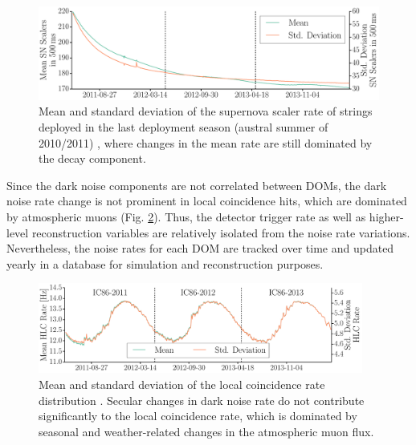 \begin{figure}[!h]
 \centering
 \includegraphics[width=1.0\textwidth]{graphics/dom/performance/darknoise/SN_Scalers_IC86_mean_variance_Histo_IC86_2011_2012_2013_geomapping.pdf}
 \caption{Mean and standard deviation of the supernova scaler rate of strings
   deployed in the last deployment season (austral summer of 2010/2011)
   \cite{briedel_phd}, where changes in the mean rate are
still dominated by the decay component.} 
 \label{fig:noise_over_time_briedel_lastseasondepoyed}
\end{figure}

Since the dark noise components are not correlated between
DOMs, the dark noise rate change is not prominent in local coincidence
hits, which are dominated by atmospheric muons (Fig.
\ref{fig:hlc_over_time_briedel}).  Thus, the detector trigger rate as well
as higher-level reconstruction variables are relatively isolated from the
noise rate variations.  Nevertheless, the noise rates for each DOM are
tracked over time and updated yearly in a database for simulation and
reconstruction purposes. 

\begin{figure}[!h]
 \centering
 \includegraphics[width=0.95\textwidth]{graphics/dom/performance/darknoise/HLC_Whole_Detector_Mean_Variance_IC86_2011_2012_2013.pdf}
 \caption{Mean and standard deviation of the local coincidence rate distribution
   \cite{briedel_phd}.  Secular changes in dark noise rate do not
   contribute significantly to the local coincidence rate,
  which is dominated by seasonal and weather-related
   changes in the atmospheric muon flux.} 
 \label{fig:hlc_over_time_briedel}
\end{figure}



